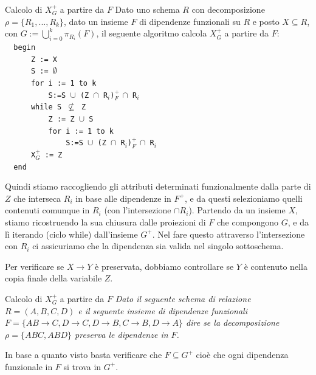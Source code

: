 \begin{enumerate}
    \begin{Algoritmo}{Calcolo di $X^+_G$ a partire da $F$}{}\label{algo:calcolo-x+g}
        Dato uno schema $R$ con decomposizione $\rho=\{R_1,...,R_k\}$, dato un insieme $F$ di dipendenze funzionali su $R$ e posto $X\subseteq R$, con $ G:=\bigcup^k_{i=0}\pi_{R_i}(F)$, il seguente algoritmo calcola $X^+_G$ a partire da $F$:\\
        \verb|  begin|\\
        \verb|      Z := X|\\
        \verb|      S := |$\emptyset$\\
        \verb|      for i := 1 to k|\\
        \verb|          S:=S |$\cup$\verb| (Z |$\cap$\verb| R|$_i$\verb|)|$^+_F$ $\cap$\verb| R|$_i$\\
        \verb|      while S |$\not\subseteq$\verb| Z|\\
        \verb|          Z := Z |$\cup$\verb| S|\\
        \verb|          for i := 1 to k|\\
        \verb|              S:=S |$\cup$\verb| (Z |$\cap$\verb| R|$_i$\verb|)|$^+_F$ $\cap$\verb| R|$_i$\\
        \verb|      X|$^+_G$\verb| := Z|\\
        \verb|  end|

        Quindi stiamo raccogliendo gli attributi determinati funzionalmente dalla parte di $Z$ che interseca $R_i$ in base alle dipendenze in $F^+$, e da questi selezioniamo quelli contenuti comunque in $R_i$ (con l'intersezione $\cap R_i$). Partendo da un insieme $X$, stiamo ricostruendo la sua chiusura dalle proiezioni di $F$ che compongono $G$, e da lì iterando (ciclo while) dall'insieme $G^+$. Nel fare questo attraverso l'intersezione con $R_i$ ci assicuriamo che la dipendenza sia valida nel singolo sottoschema.
    \end{Algoritmo}

    Per verificare se $X\to Y$ è preservata, dobbiamo controllare se $Y$ è contenuto nella copia finale della variabile $Z$.

    \begin{Example}{Calcolo di $X^+_G$ a partire da $F$}{}
        \textit{Dato il seguente schema di relazione $R = (A, B, C, D)$ e il seguente insieme di dipendenze funzionali $F = \{ AB\to C, D\to C, D\to B, C\to B, D\to A \}$ dire se la decomposizione $\rho = \{ ABC,ABD \}$ preserva le dipendenze in $F$.}

        In base a quanto visto basta verificare che $F\subseteq G^+$ cioè che ogni dipendenza funzionale in $F$ si trova in $G^+$.


\end{Example}
\end{enumerate}
